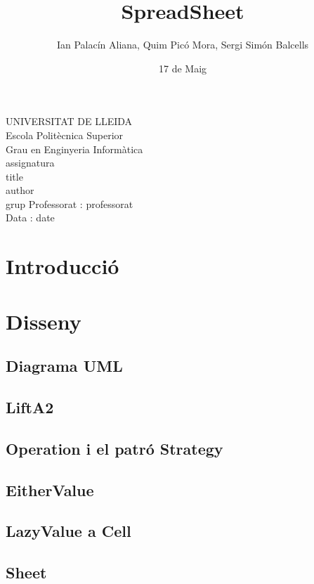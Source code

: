 \documentclass{article}
\title{SpreadSheet}
\author{Ian Palacín Aliana, Quim Picó Mora, Sergi Simón Balcells}
\date{17 de Maig}
\renewcommand{\maketitle}{ %
	\begin{titlepage}
		\raggedright{UNIVERSITAT DE LLEIDA \\
			Escola Politècnica Superior \\
			Grau en Enginyeria Informàtica\\
			\1assignatura\\}
		\vspace{5cm}
		\centering\huge{\5title \\}
		\vspace{3cm}
		\large{\6author} \\
		\normalsize{\3grup}
		\vfill
		Professorat : \4professorat \\
		Data : \7date
\end{titlepage}}
\begin{document}
	\maketitle
	\newpage
	\section{Introducció}
	\section{Disseny}
	\subsection{Diagrama UML}
	\subsection{LiftA2}
	\subsection{Operation i el patró Strategy}
	\subsection{EitherValue}
	\subsection{LazyValue a Cell}
	\subsection{Sheet}
\end{document}
